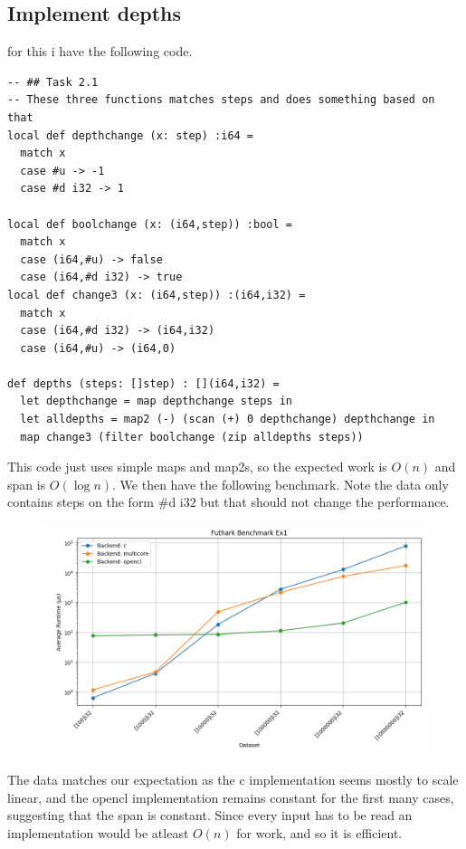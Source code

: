 \documentclass[a4paper,12pt]{article}
\begin{document}
\subsection{Implement depths}
for this i have the following code.
\begin{lstlisting}
-- ## Task 2.1
-- These three functions matches steps and does something based on that
local def depthchange (x: step) :i64 =
  match x
  case #u -> -1
  case #d i32 -> 1

local def boolchange (x: (i64,step)) :bool =
  match x
  case (i64,#u) -> false
  case (i64,#d i32) -> true
local def change3 (x: (i64,step)) :(i64,i32) =
  match x
  case (i64,#d i32) -> (i64,i32)
  case (i64,#u) -> (i64,0)

def depths (steps: []step) : [](i64,i32) =
  let depthchange = map depthchange steps in
  let alldepths = map2 (-) (scan (+) 0 depthchange) depthchange in
  map change3 (filter boolchange (zip alldepths steps))
\end{lstlisting}
This code just uses simple maps and map2s, so the expected work is \(O(n)\)
and span is \(O(\log n)\). We then have the following benchmark. Note the
data only contains steps on the form \(\#\text{d i}32\) but that should not
change the performance.
\begin{figure}[H]
	\centering
	\includegraphics[width=\linewidth]{Ex1benchmark_results.png}
\end{figure}
The data matches our expectation as the c implementation seems mostly to
scale linear, and the opencl implementation remains constant for the first
many cases, suggesting that the span is constant. Since every input has to
be read an implementation would be atleast \(O(n)\) for work, and so it is
efficient.
\end{document}
